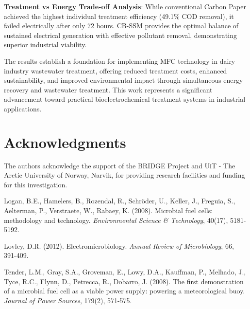 \documentclass[12pt,a4paper]{article}
\begin{document}
\textbf{Treatment vs Energy Trade-off Analysis}:
While conventional Carbon Paper achieved the highest individual treatment efficiency (49.1\% COD removal), it failed electrically after only 72 hours. CB-SSM provides the optimal balance of sustained electrical generation with effective pollutant removal, demonstrating superior industrial viability.

The results establish a foundation for implementing MFC technology in dairy industry wastewater treatment, offering reduced treatment costs, enhanced sustainability, and improved environmental impact through simultaneous energy recovery and wastewater treatment. This work represents a significant advancement toward practical bioelectrochemical treatment systems in industrial applications.

\section*{Acknowledgments}

The authors acknowledge the support of the BRIDGE Project and UiT - The Arctic University of Norway, Narvik, for providing research facilities and funding for this investigation.

\begin{thebibliography}{99}

Logan, B.E., Hamelers, B., Rozendal, R., Schröder, U., Keller, J., Freguia, S., Aelterman, P., Verstraete, W., Rabaey, K. (2008). Microbial fuel cells: methodology and technology. \textit{Environmental Science \& Technology}, 40(17), 5181-5192.

Lovley, D.R. (2012). Electromicrobiology. \textit{Annual Review of Microbiology}, 66, 391-409.

Tender, L.M., Gray, S.A., Groveman, E., Lowy, D.A., Kauffman, P., Melhado, J., Tyce, R.C., Flynn, D., Petrecca, R., Dobarro, J. (2008). The first demonstration of a microbial fuel cell as a viable power supply: powering a meteorological buoy. \textit{Journal of Power Sources}, 179(2), 571-575.

\end{thebibliography}
\end{document}
